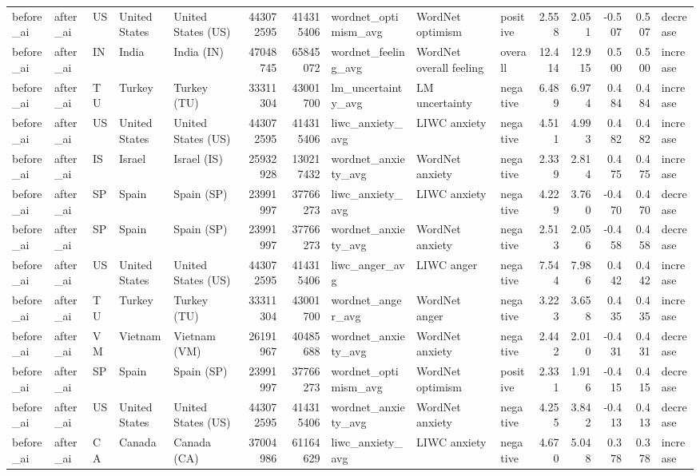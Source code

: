 \begin{tabular}{lllllrrlllrrrrl}
before\_ai & after\_ai & US & United States & United States (US) & 443072595 & 414315406 & wordnet\_optimism\_avg & WordNet optimism & positive & 2.558 & 2.051 & -0.507 & 0.507 & decrease \\
before\_ai & after\_ai & IN & India & India (IN) & 47048745 & 65845072 & wordnet\_feeling\_avg & WordNet overall feeling & overall & 12.414 & 12.915 & 0.500 & 0.500 & increase \\
before\_ai & after\_ai & TU & Turkey & Turkey (TU) & 33311304 & 43001700 & lm\_uncertainty\_avg & LM uncertainty & negative & 6.489 & 6.974 & 0.484 & 0.484 & increase \\
before\_ai & after\_ai & US & United States & United States (US) & 443072595 & 414315406 & liwc\_anxiety\_avg & LIWC anxiety & negative & 4.511 & 4.993 & 0.482 & 0.482 & increase \\
before\_ai & after\_ai & IS & Israel & Israel (IS) & 25932928 & 130217432 & wordnet\_anxiety\_avg & WordNet anxiety & negative & 2.339 & 2.814 & 0.475 & 0.475 & increase \\
before\_ai & after\_ai & SP & Spain & Spain (SP) & 23991997 & 37766273 & liwc\_anxiety\_avg & LIWC anxiety & negative & 4.229 & 3.760 & -0.470 & 0.470 & decrease \\
before\_ai & after\_ai & SP & Spain & Spain (SP) & 23991997 & 37766273 & wordnet\_anxiety\_avg & WordNet anxiety & negative & 2.513 & 2.056 & -0.458 & 0.458 & decrease \\
before\_ai & after\_ai & US & United States & United States (US) & 443072595 & 414315406 & liwc\_anger\_avg & LIWC anger & negative & 7.544 & 7.986 & 0.442 & 0.442 & increase \\
before\_ai & after\_ai & TU & Turkey & Turkey (TU) & 33311304 & 43001700 & wordnet\_anger\_avg & WordNet anger & negative & 3.223 & 3.658 & 0.435 & 0.435 & increase \\
before\_ai & after\_ai & VM & Vietnam & Vietnam (VM) & 26191967 & 40485688 & wordnet\_anxiety\_avg & WordNet anxiety & negative & 2.442 & 2.010 & -0.431 & 0.431 & decrease \\
before\_ai & after\_ai & SP & Spain & Spain (SP) & 23991997 & 37766273 & wordnet\_optimism\_avg & WordNet optimism & positive & 2.331 & 1.916 & -0.415 & 0.415 & decrease \\
before\_ai & after\_ai & US & United States & United States (US) & 443072595 & 414315406 & wordnet\_anxiety\_avg & WordNet anxiety & negative & 4.255 & 3.842 & -0.413 & 0.413 & decrease \\
before\_ai & after\_ai & CA & Canada & Canada (CA) & 37004986 & 61164629 & liwc\_anxiety\_avg & LIWC anxiety & negative & 4.670 & 5.048 & 0.378 & 0.378 & increase \\

\end{tabular}
